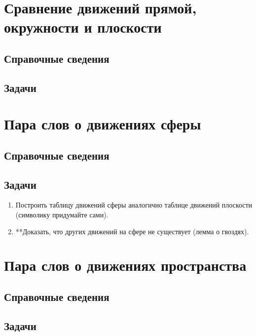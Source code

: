 \begin{enumerate}
\end{enumerate}


\section{Сравнение движений прямой, окружности и плоскости}

\subsection*{Справочные сведения}

\subsection*{Задачи}




\section{Пара слов о движениях сферы}

\subsection*{Справочные сведения}

\subsection*{Задачи}

\begin{enumerate}
\item Построить таблицу движений сферы аналогично таблице движений плоскости (символику придумайте сами).
\item **Доказать, что других движений на сфере не существует (лемма о гвоздях).
\end{enumerate}


\section{Пара слов о движениях пространства}

\subsection*{Справочные сведения}

\subsection*{Задачи}

